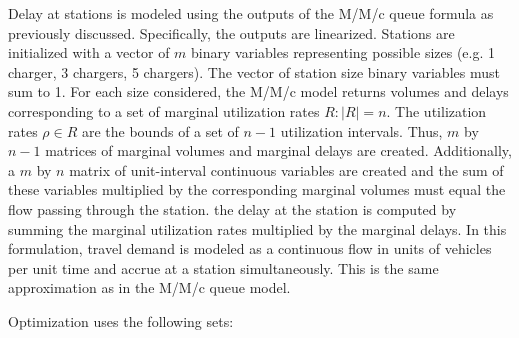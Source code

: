 Delay at stations is modeled using the outputs of the M/M/c queue formula as previously discussed. Specifically, the outputs are linearized. Stations are initialized with a vector of $m$ binary variables representing possible sizes (e.g. 1 charger, 3 chargers, 5 chargers). The vector of station size binary variables must sum to 1. For each size considered, the M/M/c model returns volumes and delays corresponding to a set of marginal utilization rates $R: |R| = n$. The utilization rates $\rho \in R$ are the bounds of a set of $n - 1$ utilization intervals. Thus, $m$ by $n - 1$ matrices of marginal volumes and marginal delays are created. Additionally, a $m$ by $n$ matrix of unit-interval continuous variables are created and the sum of these variables multiplied by the corresponding marginal volumes must equal the flow passing through the station. the delay at the station is computed by summing the marginal utilization rates multiplied by the marginal delays. In this formulation, travel demand is modeled as a continuous flow in units of vehicles per unit time and accrue at a station simultaneously. This is the same approximation as in the M/M/c queue model.

Optimization uses the following sets:

